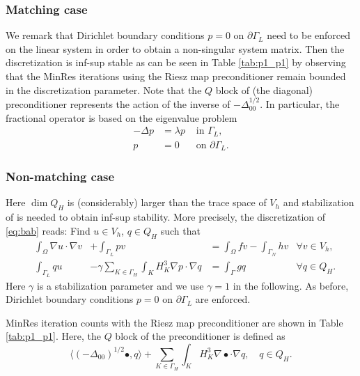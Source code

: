 \documentclass[r]{siamart171218}
\begin{document}
\subsubsection{Matching case} We remark that Dirichlet boundary conditions
$p=0$ on $\partial\Gamma_L$ need to be enforced on the linear system in order
to obtain a non-singular system matrix. Then the discretization is inf-sup
stable as can be seen in Table \ref{tab:p1_p1} by observing that the MinRes
iterations using the Riesz map preconditioner remain bounded in the discretization
parameter. Note that the $Q$ block of (the diagonal) preconditioner represents
the action of the inverse of $-\Delta^{1/2}_{00}$. In particular, the fractional
operator is based on the eigenvalue problem
%
\[
\begin{aligned}
  -\Delta p &= \lambda p &\mbox{ in }\Gamma_L,\\
          p &= 0         &\mbox{ on }\partial\Gamma_L.
\end{aligned}
\]
%

\subsubsection{Non-matching case} Here $\dim Q_H$ is (considerably) larger
than the trace space of $V_h$ and stabilization of \cite{burman2014projection}
is needed to obtain inf-sup stability. More precisely, the discretization
of \eqref{eq:bab} reads: Find $u\in V_h$, $q\in Q_H$ such that
\[
\begin{aligned}
&\int_{\Omega} \nabla u\cdot \nabla v &+ \int_{\Gamma_L}p v &= \int_{\Omega} f v - \int_{\Gamma_N}h v &\forall v\in V_h,\\
  &\int_{\Gamma_L}q u  &-\gamma \sum_{K\in\Gamma_H}\int_{K} H_K^3\nabla p\cdot\nabla q &= \int_{\Gamma} g q &\forall q\in Q_H.
  \end{aligned}
\]
Here $\gamma$ is a stabilization parameter and we use $\gamma=1$ in the
following. As before, Dirichlet boundary conditions $p=0$ on $\partial\Gamma_L$ are
enforced.

MinRes iteration counts with the Riesz map preconditioner are shown in
Table \ref{tab:p1_p1}. Here, the $Q$ block of the preconditioner is
defined as
\[
\langle (-\Delta_{00})^{1/2} \bullet, q\rangle + \sum_{K\in\Gamma_H}\int_{K} H_K^3\nabla \bullet \cdot\nabla q,\quad q\in Q_H.
\]
%
\end{document}
